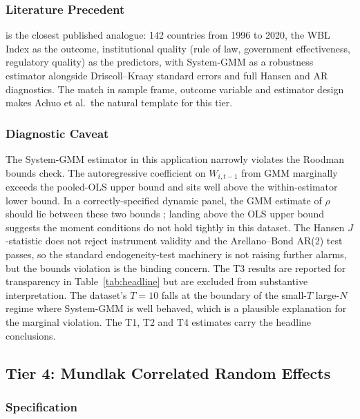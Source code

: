 \documentclass[12pt,a4paper]{article}
\begin{document}
\subsubsection{Literature Precedent}

\citet{Achuo2024} is the closest published analogue: 142 countries from 1996 to 2020, the WBL Index as the outcome, institutional quality (rule of law, government effectiveness, regulatory quality) as the predictors, with System-GMM as a robustness estimator alongside Driscoll--Kraay standard errors and full Hansen and AR diagnostics. The match in sample frame, outcome variable and estimator design makes Achuo et al.\ the natural template for this tier.

\subsubsection{Diagnostic Caveat}

The System-GMM estimator in this application narrowly violates the Roodman bounds check. The autoregressive coefficient on $W_{i,t-1}$ from GMM marginally exceeds the pooled-OLS upper bound and sits well above the within-estimator lower bound. In a correctly-specified dynamic panel, the GMM estimate of $\rho$ should lie between these two bounds \citep{Roodman2009}; landing above the OLS upper bound suggests the moment conditions do not hold tightly in this dataset. The Hansen $J$-statistic does not reject instrument validity and the Arellano--Bond AR(2) test passes, so the standard endogeneity-test machinery is not raising further alarms, but the bounds violation is the binding concern. The T3 results are reported for transparency in Table~\ref{tab:headline} but are excluded from substantive interpretation. The dataset's $T = 10$ falls at the boundary of the small-$T$ large-$N$ regime where System-GMM is well behaved, which is a plausible explanation for the marginal violation. The T1, T2 and T4 estimates carry the headline conclusions.

\subsection{Tier 4: Mundlak Correlated Random Effects}

\subsubsection{Specification}
\end{document}
